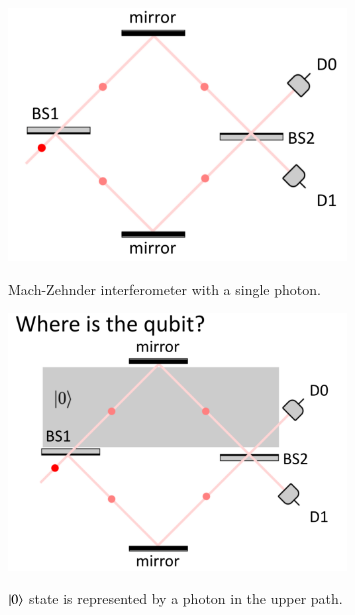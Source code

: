\begin{figure}[H]
   \centering
    \includegraphics[width=0.8\textwidth]{lesson6/mach_zehnder_single_photon.pdf}
    \label{fig: 1}
    \begin{center}
        \caption{Mach-Zehnder interferometer with a single photon.}
    \end{center}
\end{figure}

\begin{figure}[H]
   \centering
    \includegraphics[width=0.8\textwidth]{lesson6/0_ket_botttom.pdf}
    \label{fig: 1}
    \begin{center}
        \caption{$\ket{0}$ state is represented by a photon in the upper path.}
    \end{center}
\end{figure}

